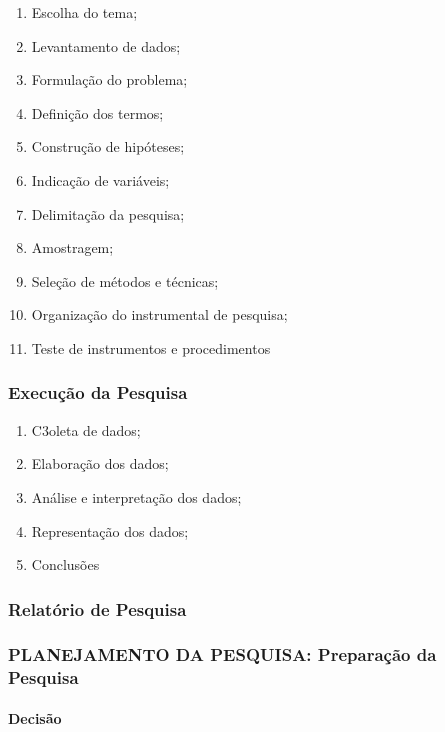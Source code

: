 \documentclass[
]{book}
\providecommand{\tightlist}{%
  \setlength{\itemsep}{0pt}\setlength{\parskip}{0pt}}
\begin{document}
\begin{enumerate}
\def\labelenumi{\arabic{enumi}.}
\tightlist
\item
  Escolha do tema;
\item
  Levantamento de dados;
\item
  Formulação do problema;
\item
  Definição dos termos;
\item
  Construção de hipóteses;
\item
  Indicação de variáveis;
\item
  Delimitação da pesquisa;
\item
  Amostragem;
\item
  Seleção de métodos e técnicas;
\item
  Organização do instrumental de pesquisa;
\item
  Teste de instrumentos e procedimentos
\end{enumerate}

\hypertarget{execuuxe7uxe3o-da-pesquisa}{%
\subsubsection{Execução da Pesquisa}\label{execuuxe7uxe3o-da-pesquisa}}

\begin{enumerate}
\def\labelenumi{\arabic{enumi}.}
\tightlist
\item
  C3oleta de dados;
\item
  Elaboração dos dados;
\item
  Análise e interpretação dos dados;
\item
  Representação dos dados;
\item
  Conclusões
\end{enumerate}

\hypertarget{relatuxf3rio-de-pesquisa}{%
\subsubsection{Relatório de Pesquisa}\label{relatuxf3rio-de-pesquisa}}

\hypertarget{planejamento-da-pesquisa-preparauxe7uxe3o-da-pesquisa}{%
\subsubsection{PLANEJAMENTO DA PESQUISA: Preparação da Pesquisa}\label{planejamento-da-pesquisa-preparauxe7uxe3o-da-pesquisa}}

\hypertarget{decisuxe3o}{%
\paragraph{Decisão}\label{decisuxe3o}}
\end{document}
